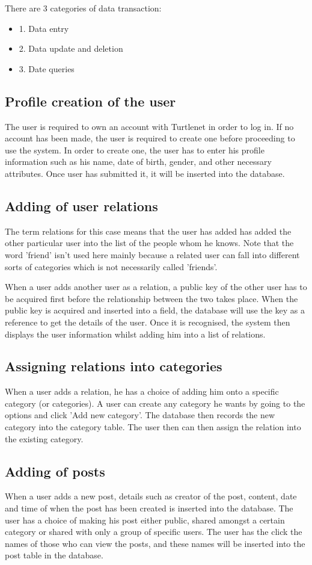 There are 3 categories of data transaction:
\begin{itemize}
\item 1. Data entry
\item 2. Data update and deletion
\item 3. Date queries
\end{itemize}

\subsection{Profile creation of the user}
The user is required to own an account with Turtlenet in order to log in. If
no account has been made, the user is required to create one before proceeding
to use the system. In order to create one, the user has to enter his profile
information such as his name, date of birth, gender, and other necessary
attributes. Once user has submitted it, it will be inserted into the database.

\subsection{Adding of user relations}
The term relations for this case means that the user has added has added the
other particular user into the list of the people whom he knows. Note that the
word 'friend' isn't used here mainly because a related user can fall into
different sorts of categories which is not necessarily called 'friends'.

When a user adds another user as a relation, a public key of the other user has
to be acquired first before the relationship between the two takes place. When
the public key is acquired and inserted into a field, the database will use the
key as a reference to get the details of the user. Once it is recognised, the
system then displays the user information whilst adding him into a list of
relations.

\subsection{Assigning relations into categories}
When a user adds a relation, he has a choice of adding him onto a specific
category (or categories). A user can create any category he wants by going to
the options and click 'Add new category'. The database then records the new
category into the category table.  The user then can then assign the relation
into the existing category. 

\subsection{Adding of posts}
When a user adds a new post, details such as creator of the post, content, date
and time of when the post has been created is inserted into the database. The
user has a choice of making his post either public, shared amongst a certain
category or shared with only a group of specific users. The user has the click
the names of those who can view the posts, and these names will be inserted into
the post table in the database.

